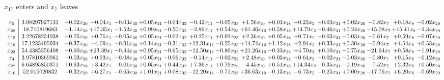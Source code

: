 \documentclass[9pt]{article}
\begin{document}
 $ x_{17} $ enters and $ x_{7} $ leaves 

 \[\begin{array}{c| c c@{\hskip 2pt} c@{\hskip 2pt} c@{\hskip 2pt} c@{\hskip 2pt} c@{\hskip 2pt} c@{\hskip 2pt} c@{\hskip 2pt} c@{\hskip 2pt} c@{\hskip 2pt} c@{\hskip 2pt} c@{\hskip 2pt} c@{\hskip 2pt} c@{\hskip 2pt} c@{\hskip 2pt} c@{\hskip 2pt} }
 x_{5}   &  3.98297927131 & -0.02 x_{20} & -0.04 x_{1} & -0.03 x_{30} & +  0.05 x_{21} & -0.04 x_{32} & -0.42 x_{11} & -0.05 x_{25} & +  1.56 x_{10} & +  0.01 x_{18} & +  0.23 x_{2} & -0.03 x_{31} & +  0.02 x_{26} & -0.82 x_{7} & +  0.18 x_{8} & -0.02 x_{29}\\
 x_{28}   &  18.710819683 & -1.14 x_{20} & + 17.35 x_{1} & -1.52 x_{30} & +  0.99 x_{21} & -0.50 x_{32} & -2.89 x_{11} & +  0.54 x_{25} & + 61.46 x_{10} & +  0.58 x_{18} & + 14.79 x_{2} & -0.46 x_{31} & +  0.24 x_{26} & -15.08 x_{7} & + 15.41 x_{8} & -2.34 x_{29}\\
 x_{15}   &  3.22678234938 & -0.05 x_{20} & +  0.76 x_{1} & -0.05 x_{30} & +  0.05 x_{21} & -0.02 x_{32} & +  0.25 x_{11} & +  0.02 x_{25} & +  2.36 x_{10} & +  0.05 x_{18} & +  0.71 x_{2} & -0.03 x_{31} & -0.03 x_{26} & -0.61 x_{7} & +  0.59 x_{8} & -0.07 x_{29}\\
 x_{19}   &  17.1233495934 & -0.37 x_{20} & -4.09 x_{1} & -0.91 x_{30} & +  0.14 x_{21} & -0.31 x_{32} & + 12.31 x_{11} & -0.25 x_{25} & + 14.74 x_{10} & +  1.12 x_{18} & +  2.94 x_{2} & +  0.33 x_{31} & +  0.30 x_{26} & -0.94 x_{7} & +  4.54 x_{8} & +  0.53 x_{29}\\
 x_{23}   &  54.4385356408 & -0.60 x_{20} & + 23.39 x_{1} & -0.44 x_{30} & +  0.95 x_{21} & -0.65 x_{32} & -12.50 x_{11} & -0.80 x_{25} & + 21.26 x_{10} & -0.33 x_{18} & +  4.70 x_{2} & +  0.10 x_{31} & -0.75 x_{26} & -21.64 x_{7} & +  0.58 x_{8} & -1.91 x_{29}\\
 x_{4}   &  3.97810369961 & -0.03 x_{20} & +  0.93 x_{1} & -0.08 x_{30} & +  0.05 x_{21} & -0.06 x_{32} & -0.14 x_{11} & -0.02 x_{25} & +  2.48 x_{10} & +  0.03 x_{18} & +  0.64 x_{2} & -0.02 x_{31} & -0.03 x_{26} & -0.80 x_{7} & +  0.15 x_{8} & -0.12 x_{29}\\
 x_{22}   &  6.64895850371 & +  0.63 x_{20} & +  3.42 x_{1} & -0.01 x_{30} & +  0.05 x_{21} & +  0.44 x_{32} & +  7.36 x_{11} & +  0.79 x_{25} & -4.45 x_{10} & +  0.51 x_{18} & + 14.34 x_{2} & -0.35 x_{31} & -0.19 x_{26} & -7.52 x_{7} & +  2.32 x_{8} & +  0.50 x_{29}\\
 x_{16}   &  52.015020832 & -0.32 x_{20} & +  6.27 x_{1} & -0.65 x_{30} & +  1.01 x_{21} & +  0.08 x_{32} & -12.20 x_{11} & -0.71 x_{25} & + 36.63 x_{10} & -0.13 x_{18} & -6.73 x_{2} & -0.25 x_{31} & +  0.00 x_{26} & -17.76 x_{7} & +  6.20 x_{8} & -0.69 x_{29}\\

\end{array}\]
\end{document}
